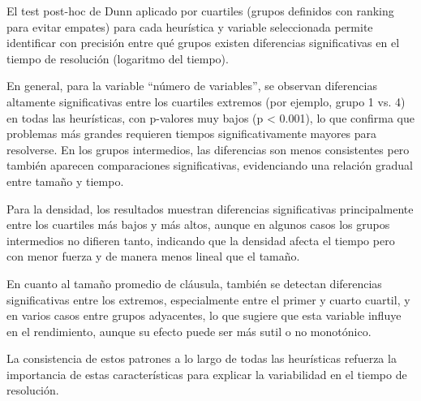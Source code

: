 El test post-hoc de Dunn aplicado por cuartiles (grupos definidos con ranking para evitar empates) para cada heurística y variable seleccionada permite identificar con precisión entre qué grupos existen diferencias significativas en el tiempo de resolución (logaritmo del tiempo).

En general, para la variable ``número de variables'', se observan diferencias altamente significativas entre los cuartiles extremos (por ejemplo, grupo 1 vs. 4) en todas las heurísticas, con p-valores muy bajos (p < 0.001), lo que confirma que problemas más grandes requieren tiempos significativamente mayores para resolverse. En los grupos intermedios, las diferencias son menos consistentes pero también aparecen comparaciones significativas, evidenciando una relación gradual entre tamaño y tiempo. 

Para la densidad, los resultados muestran diferencias significativas principalmente entre los cuartiles más bajos y más altos, aunque en algunos casos los grupos intermedios no difieren tanto, indicando que la densidad afecta el tiempo pero con menor fuerza y de manera menos lineal que el tamaño.

En cuanto al tamaño promedio de cláusula, también se detectan diferencias significativas entre los extremos, especialmente entre el primer y cuarto cuartil, y en varios casos entre grupos adyacentes, lo que sugiere que esta variable influye en el rendimiento, aunque su efecto puede ser más sutil o no monotónico.

La consistencia de estos patrones a lo largo de todas las heurísticas refuerza la importancia de estas características para explicar la variabilidad en el tiempo de resolución.

